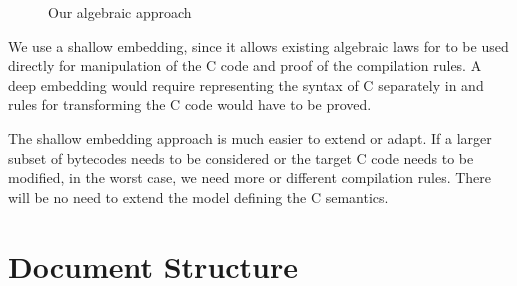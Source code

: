 \begin{figure}
  \centering
  \caption{Our algebraic approach}
  \label{our-approach-figure}
\end{figure}

We use a shallow embedding, since it allows existing algebraic laws
for \Circus{} to be used directly for manipulation of the C code
and proof of the compilation rules.
A deep embedding would require representing the syntax of C separately
in \Circus{} and rules for transforming the C code would have to be
proved.

The shallow embedding approach is much easier to extend or adapt. 
If a larger subset of bytecodes needs to be considered or the target C
code needs to be modified, in the worst case, we need more or
different \Circus{} compilation rules. 
There will be no need to extend the \Circus{} model defining the C
semantics. 

\section{Document Structure}

